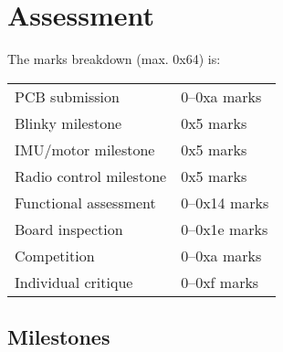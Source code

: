 \documentclass[11pt, a4paper]{article}
\begin{document}
\section{Assessment}

The marks breakdown (max. 0x64) is:
%
\begin{flushleft}
  \begin{tabular}{ll}
    PCB submission & 0--0xa marks\\
    Blinky milestone  & 0x5 marks\\    
    IMU/motor milestone  & 0x5 marks\\
    Radio control milestone  & 0x5 marks\\
    Functional assessment & 0--0x14 marks \\
    Board inspection & 0--0x1e marks \\
    Competition & 0--0xa marks \\
    Individual critique & 0--0xf marks \\
  \end{tabular}
  
\end{flushleft}

\subsection{Milestones}
\end{document}
